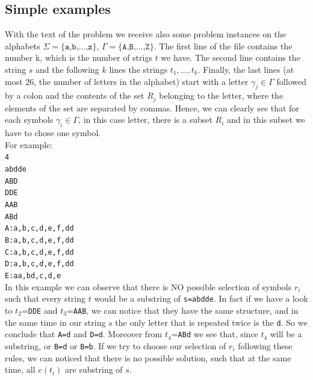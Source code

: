 \documentclass[paper=a4, fontsize=11pt]{scrartcl}
\numberwithin{equation}{section}		%
\numberwithin{figure}{section}			%
\numberwithin{table}{section}				%
\begin{document}
\subsection{Simple examples}
With the text of the problem we receive also some problem instances on the alphabets $\Sigma=\texttt{\{a,b,...,z\}}$, $\Gamma=\texttt{\{A,B,...,Z\}}$. The first line of the file contains the number k, which is the number of strigs $t$ we have. The second line contains the string $s$ and the following $k$ lines the strings $t_1,..., t_k$. Finally, the last lines (at most 26, the number of letters in the alphabet) start with a letter $\gamma_j\in \Gamma$ followed by a colon and the contents of the set $R_j$ belonging to the letter, where the elements of the set are separated by commas. Hence, we can clearly see that for each symbols $\gamma_i \in \Gamma$, in this case letter, there is a subset $R_i$ and in this subset we have to chose one symbol.
\newline
\\
\noindent For example: \newline
\\
\noindent\texttt{4} \\
\noindent \texttt{abdde} \\
\noindent \texttt{ABD} \\
\noindent \texttt{DDE} \\
\noindent \texttt{AAB} \\
\noindent \texttt{ABd} \\
\noindent \texttt{A:a,b,c,d,e,f,dd} \\
\noindent \texttt{B:a,b,c,d,e,f,dd} \\
\noindent \texttt{C:a,b,c,d,e,f,dd} \\
\noindent \texttt{D:a,b,c,d,e,f,dd} \\
\noindent \texttt{E:aa,bd,c,d,e} \\

\noindent In this example we can observe that there is NO possible selection of symbols $r_i$ such that every string $t$ would be a substring of \texttt{s=abdde}. In fact if we have a look to $t_2$=\texttt{DDE} and $t_3$=\texttt{AAB}, we can notice that they have the same structure, and in the same time in our string $s$ the only letter that is repeated twice is the \texttt{d}. So we conclude that \texttt{A=d} and \texttt{D=d}. Moreover from $t_4$=\texttt{ABd} we see that, since $t_4$ will be a substring, or \texttt{B=d} or \texttt{B=b}. If we try to choose our selection of $r_i$ following these rules, we can noticed that there is no possible solution, such that at the same time, all $e(t_i)$ are substring of $s$.
\end{document}
